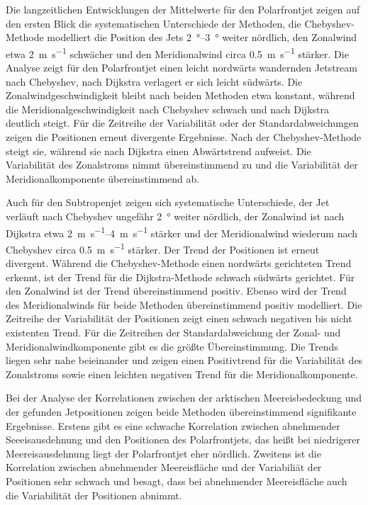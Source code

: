 Die langzeitlichen Entwicklungen der Mittelwerte für den Polarfrontjet zeigen auf den ersten Blick die systematischen Unterschiede der Methoden, die Chebyshev-Methode modelliert die Position des Jets \SIrange{2}{3}{\degree} weiter nördlich, den Zonalwind etwa \SI{2}{\metre\per\second} schwächer und den Meridionalwind circa \SI{0.5}{\metre\per\second} stärker. Die Analyse zeigt für den Polarfrontjet einen leicht nordwärts wandernden Jetstream nach Chebyshev, nach Dijkstra verlagert er sich leicht südwärts. Die Zonalwindgeschwindigkeit bleibt nach beiden Methoden etwa konstant, während die Meridionalgeschwindigkeit nach Chebyshev schwach und nach Dijkstra deutlich steigt. Für die Zeitreihe der Variabilität oder der Standardabweichungen zeigen die Positionen erneut divergente Ergebnisse. Nach der Chebyshev-Methode steigt sie, während sie nach Dijkstra einen Abwärtstrend aufweist. Die Variabilität des Zonalstroms nimmt übereinstimmend zu und die Variabilität der Meridionalkomponente übereinstimmend ab.

Auch für den Subtropenjet zeigen sich systematische Unterschiede, der Jet verläuft nach Chebyshev ungefähr \SI{2}{\degree} weiter nördlich, der Zonalwind ist nach Dijkstra etwa \SIrange{2}{4}{\metre\per\second} stärker und der Meridionalwind wiederum nach Chebyshev circa \SI{0.5}{\metre\per\second} stärker. Der Trend der Positionen ist erneut divergent. Während die Chebyshev-Methode einen nordwärts gerichteten Trend erkennt, ist der Trend für die Dijkstra-Methode schwach südwärts gerichtet. Für den Zonalwind ist der Trend übereinstimmend positiv. Ebenso wird der Trend des Meridionalwinds für beide Methoden übereinstimmend positiv modelliert. Die Zeitreihe der Variabilität der Positionen zeigt einen schwach negativen bis nicht existenten Trend. Für die Zeitreihen der Standardabweichung der Zonal- und Meridionalwindkomponente gibt es die größte Übereinstimmung. Die Trends liegen sehr nahe beieinander und zeigen einen Positivtrend für die Variabilität des Zonalstroms sowie einen leichten negativen Trend für die Meridionalkomponente.

Bei der Analyse der Korrelationen zwischen der arktischen Meereisbedeckung und der gefunden Jetpositionen zeigen beide Methoden übereinstimmend signifikante Ergebnisse. Erstens gibt es eine schwache Korrelation zwischen abnehmender Seeeisausdehnung und den Positionen des Polarfrontjets, das heißt bei niedrigerer Meereisausdehnung liegt der Polarfrontjet eher nördlich. Zweitens ist die Korrelation zwischen abnehmender Meereisfläche und der Variabiliät der Positionen sehr schwach und besagt, dass bei abnehmender Meereisfläche auch die Variabilität der Positionen abnimmt.
